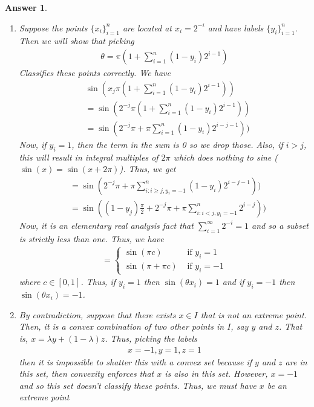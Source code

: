 \documentclass[12pt]{article}
\theoremstyle{colon}
\newtheorem*{answer}{Answer}
\begin{document}
\begin{answer}
\begin{enumerate}[label=\arabic*)]
    \item Suppose the points $\{x_i\}_{i=1}^n$ are located at $x_i = 2^{-i}$ and have labels $\{y_i\}_{i=1}^n$. Then we will show that picking
      \begin{gather*}
        \theta = \pi ( 1+ \sum_{i=1}^n (1-y_i) 2^{i-1})
      \end{gather*}
      Classifies these points correctly. We have
      \begin{align*}
        &\sin (x_j \pi ( 1+ \sum_{i=1}^n (1-y_i) 2^{i-1})) \\
        &= \sin ( 2^{-j} \pi ( 1+ \sum_{i=1}^n (1-y_i) 2^{i-1})) \\
        &= \sin(2^{-j} \pi + \pi \sum_{i=1}^n (1-y_i) 2^{i-j-1}))
      \end{align*}
      Now, if $y_i = 1$, then the term in the sum is 0 so we drop those. Also, if $i > j$, this will result in integral multiples of $2 \pi$ which does nothing to sine ($\sin(x) = \sin(x + 2 \pi)$). Thus, we get
      \begin{align*}
        &= \sin(2^{-j} \pi + \pi \sum_{i: i \geq j, y_i=-1}^n (1-y_i) 2^{i-j-1})) \\
        &= \sin((1-y_j)\frac{\pi}{2} + 2^{-j} \pi + \pi \sum_{i: i < j, y_i=-1}^n 2^{i-j}))
      \end{align*}
      Now, it is an elementary real analysis fact that $\sum_{i=1}^\infty 2^{-i} = 1$ and so a subset is strictly less than one. Thus, we have
      \begin{gather*}
        = \begin{cases}
          \sin(\pi c) &\text{ if } y_i = 1 \\
          \sin(\pi + \pi c) &\text{ if } y_i = -1
        \end{cases}
      \end{gather*}
      where $c \in [0,1]$. Thus, if $y_i = 1$ then $\sin(\theta x_i) = 1$ and if $y_i = -1$ then $\sin(\theta x_i) = -1$.

    \item By contradiction, suppose that there exists $x \in I$ that is not an extreme point. Then, it is a convex combination of two other points in $I$, say $y$ and $z$. That is, $x = \lambda y + (1-\lambda)z$. Thus, picking the labels
      \begin{gather*}
        x = -1, y = 1, z = 1
      \end{gather*}
      then it is impossible to shatter this with a convex set because if $y$ and $z$ are in this set, then convexity enforces that $x$ is also in this set. However, $x = -1$ and so this set doesn't classify these points. Thus, we must have $x$ be an extreme point


\end{enumerate}
\end{answer}
\end{document}
